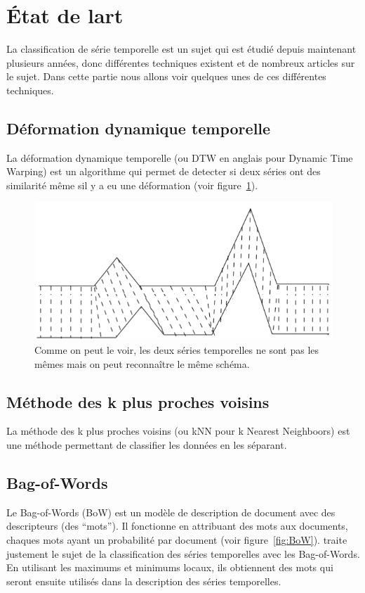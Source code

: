 \documentclass[11pt]{sdm}
\begin{document}
\section{\'Etat de l\textquotesingle art}
	La classification de s\'erie temporelle est un sujet qui est \'etudi\'e depuis maintenant plusieurs ann\'ees, donc diff\'erentes techniques existent et de nombreux articles sur le sujet. Dans cette partie nous allons voir quelques unes de ces diff\'erentes techniques.

	\subsection{D\'eformation dynamique temporelle}
		La d\'eformation dynamique temporelle (ou DTW en anglais pour Dynamic Time Warping) est un algorithme qui permet de detecter si deux s\'eries ont des similarit\'e m\^eme s\textquotesingle il y a eu une d\'eformation (voir figure~\ref{fig:dtw}).

		\begin{figure}[!ht]
			\centering
			\includegraphics[scale=0.6,natwidth=582,natheight=269]{figures/dtw.png}
			\caption{Comme on peut le voir, les deux s\'eries temporelles ne sont pas les m\^emes mais on peut reconna\^itre le m\^eme sch\'ema.}
			\label{fig:dtw}
		\end{figure}

	\subsection{M\'ethode des k plus proches voisins}
		La m\'ethode des k plus proches voisins (ou kNN pour k Nearest Neighboors) est une m\'ethode permettant de classifier les donn\'ees en les s\'eparant.

	\subsection{Bag-of-Words}	
		Le Bag-of-Words (BoW) est un mod\`ele de description de document avec des descripteurs (des “mots”). Il fonctionne en attribuant des mots aux documents, chaques mots ayant un probabilit\'e par document (voir figure~\ref{fig:BoW}). \cite{bailly2015bag} traite justement le sujet de la classification des s\'eries temporelles avec les Bag-of-Words. En utilisant les maximums et minimums locaux, ils obtiennent des mots qui seront ensuite utilis\'es dans la description des s\'eries temporelles.
\end{document}
